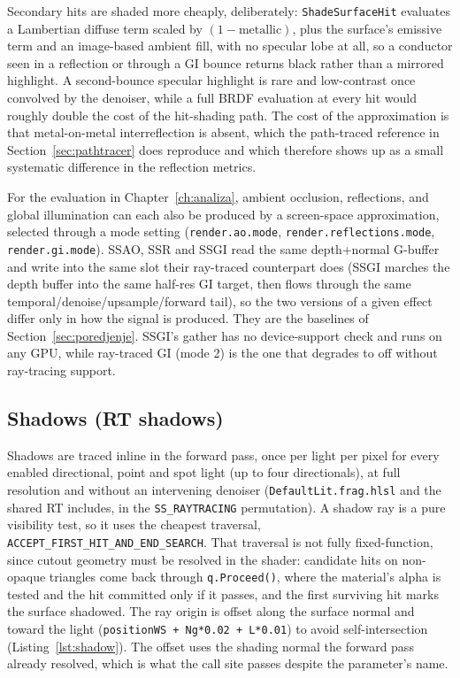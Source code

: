 Secondary hits are shaded more cheaply, deliberately: \texttt{ShadeSurfaceHit} evaluates a Lambertian
diffuse term scaled by $(1 - \text{metallic})$, plus the surface's emissive term and an image-based
ambient fill, with no specular lobe at all, so a conductor seen in a reflection or through a GI bounce
returns black rather than a mirrored highlight. A second-bounce specular highlight is rare and
low-contrast once convolved by the denoiser, while a full BRDF evaluation at every hit would roughly
double the cost of the hit-shading path. The cost of the approximation is that metal-on-metal
interreflection is absent, which the path-traced reference in Section~\ref{sec:pathtracer} does
reproduce and which therefore shows up as a small systematic difference in the reflection metrics.

For the evaluation in Chapter~\ref{ch:analiza}, ambient occlusion, reflections, and global
illumination can each also be produced by a screen-space approximation, selected through a mode
setting (\texttt{render.ao.mode}, \texttt{render.reflections.mode}, \texttt{render.gi.mode}). SSAO,
SSR and SSGI read the same depth+normal G-buffer and write into the same slot their ray-traced
counterpart does (SSGI marches the depth buffer into the same half-res GI target, then flows through
the same temporal/denoise/upsample/forward tail), so the two versions of a given effect differ only
in how the signal is produced. They are the baselines of Section~\ref{sec:poredjenje}. SSGI's gather
has no device-support check and runs on any GPU, while ray-traced GI (mode 2) is the one that
degrades to off without ray-tracing support.

\subsection{Shadows (RT shadows)}
\label{sec:senke}

Shadows are traced inline in the forward pass, once per light per pixel for every enabled directional,
point and spot light (up to four directionals), at full resolution and
without an intervening denoiser (\texttt{DefaultLit.frag.hlsl} and the shared RT includes, in the
\texttt{SS_RAYTRACING} permutation). A shadow ray is a pure visibility test, so it uses the cheapest
traversal, \texttt{ACCEPT_FIRST_HIT_AND_END_SEARCH}. That traversal is not fully fixed-function,
since cutout geometry must be resolved in the shader: candidate hits on non-opaque triangles come back
through \texttt{q.Proceed()}, where the material's alpha is tested and the hit committed only if it
passes, and the first surviving hit marks the surface shadowed. The ray origin is offset along the
surface normal and toward the light (\texttt{positionWS + Ng*0.02 + L*0.01}) to avoid
self-intersection (Listing~\ref{lst:shadow}). The offset uses the shading normal the forward pass
already resolved, which is what the call site passes despite the parameter's name.

